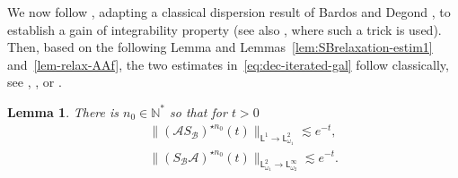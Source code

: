\documentclass[11pt]{amsart}
\newtheorem{lemma}[theorem]{Lemma}
\theoremstyle{definition}
\theoremstyle{remark}
\numberwithin{equation}{section}
\newcommand\N{{\mathbb N}}
\def\AA{{\mathcal A}}
\def\BB{{\mathcal B}}
\newcommand{\sfL}{\mathsf{L}}
\begin{document}
We now follow \cite[Lemma 3.2]{MR3591133}, adapting a classical dispersion result of Bardos and Degond \cite{MR794002}, to establish a gain of integrability property (see also \cite{MR259662}, where such a trick is used). Then, based on the following Lemma and Lemmas~\ref{lem:SBrelaxation-estim1} and~\ref{lem-relax-AAf}, the two estimates in~\eqref{eq:dec-iterated-gal} follow classically, see \cite{MR3779780}, \cite{MisMou}, or \cite[Proposition 2.5]{MR3465438}.

\begin{lemma}
  \label{lem:dispersionAS_BA}
  There is $n_0 \in \N^*$ so that for $t > 0$
  \begin{eqnarray}
    \label{eq:AS_Btwice}
    && \big\| (\AA S_\BB)^{\star n_0}(t) \big\|_{\sfL^{1} \to \sfL^{2}_{\omega_1}} \lesssim e^{-t}, \\
    \label{eq:S_BAtwice}
    && \big\| (S_\BB \AA)^{\star n_0}(t) \big\|_{\sfL^{2}_{\omega_1} \to \sfL^{\infty}_{\omega_2}} \lesssim e^{-t}.
  \end{eqnarray}
\end{lemma}
\end{document}
